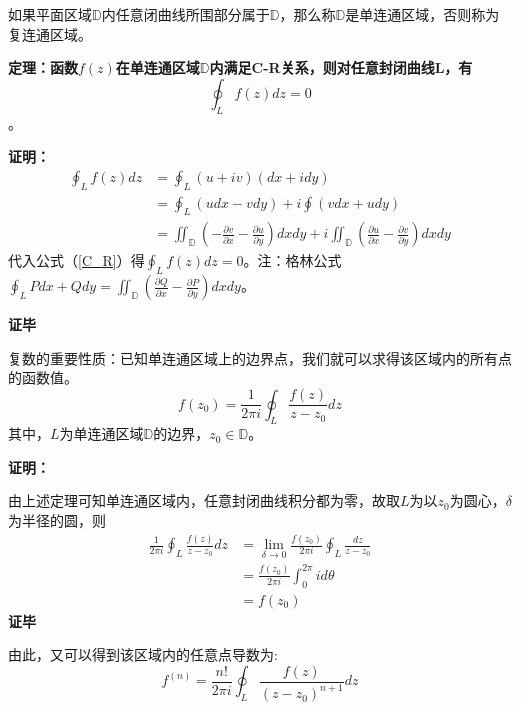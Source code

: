 	如果平面区域$\mathbb{D}$内任意闭曲线所围部分属于$\mathbb{D}$，那么称$\mathbb{D}$是单连通区域，否则称为复连通区域。
	
	\noindent\textbf{定理：函数$f(z)$在单连通区域$\mathbb{D}$内满足C-R关系，则对任意封闭曲线L，有}
	\begin{equation}
	\label{theory_oint}
		\oint_Lf(z)dz=0
	\end{equation}。
	
	\noindent\textbf{证明：}
	\begin{equation*}
	\begin{aligned}
		\oint_Lf(z)dz &= \oint_L(u+iv)(dx+idy)	\\
		&= \oint_L(udx-vdy) +i\oint(vdx+udy)	\\
		&= \iint_{\mathbb{D}}(-\frac{\partial v}{\partial x} - \frac{\partial u}{\partial y})dxdy + i\iint_{\mathbb{D}}(\frac{\partial u}{\partial x}-\frac{\partial v}{\partial y})dxdy
	\end{aligned}
	\end{equation*}
	代入公式（\ref{C_R}）得$\oint_Lf(z)dz=0$。注：格林公式$\oint_LPdx+Qdy=\iint_{\mathbb{D}}(\frac{\partial Q}{\partial x}-\frac{\partial P}{\partial y})dxdy$。
	
	\hfill{\textbf{证毕}}
	
	复数的重要性质：已知单连通区域上的边界点，我们就可以求得该区域内的所有点的函数值。
	\begin{equation}
	\label{complex_ch1}
		f(z_0)=\frac{1}{2\pi i}\oint_L\frac{f(z)}{z-z_0}dz
	\end{equation}
	其中，$L$为单连通区域$\mathbb{D}$的边界，$z_0\in\mathbb{D}$。
	
	\noindent\textbf{证明：}
	
	由上述定理可知单连通区域内，任意封闭曲线积分都为零，故取$L$为以$z_0$为圆心，$\delta$为半径的圆，则
	\begin{equation}
	\begin{aligned}
		\frac{1}{2\pi i}\oint_L\frac{f(z)}{z-z_0}dz &= \lim\limits_{\delta\to 0}\frac{f(z_0)}{2\pi i}\oint_L\frac{dz}{z-z_0}	\\
		&= \frac{f(z_0)}{2\pi i}\int_0^{2\pi}id\theta	\\
		&= f(z_0)
	\end{aligned}
	\end{equation}
	\hfill{\textbf{证毕}}
	
	由此，又可以得到该区域内的任意点导数为:
	\begin{equation}
	\label{complex_ch2}
		f^{(n)} = \frac{n!}{2\pi i}\oint_L\frac{f(z)}{(z-z_0)^{n+1}}dz
	\end{equation}
	

